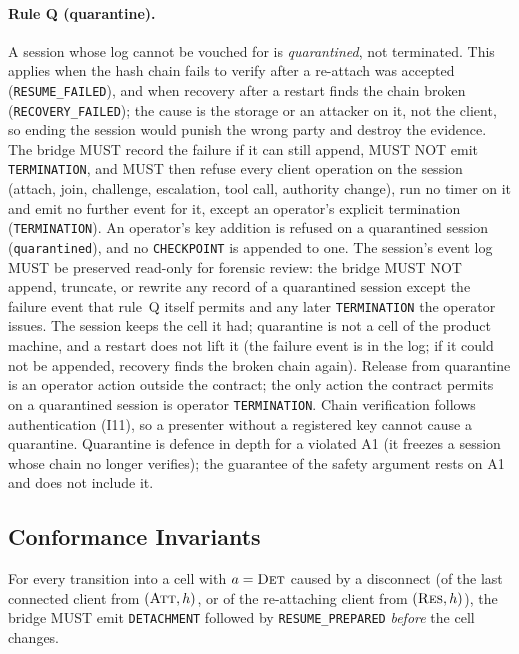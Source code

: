 \paragraph{Rule Q (quarantine).} A session whose log cannot be vouched
for is \emph{quarantined}, not terminated. This applies when the hash
chain fails to verify after a re-attach was accepted
(\texttt{RESUME\_FAILED}), and when recovery after a restart finds the
chain broken
(\texttt{RECOVERY\_FAILED}); the cause is the storage or an attacker on it,
not the client, so ending the session would punish the wrong party and
destroy the evidence. The bridge MUST record the failure if it can still
append, MUST NOT emit \texttt{TERMINATION}, and MUST then refuse every
client operation on the session (attach, join, challenge, escalation,
tool call, authority change), run no timer on it and emit no further event
for it, except an operator's explicit termination (\texttt{TERMINATION}).
An operator's key addition is refused on a quarantined session
(\texttt{quarantined}), and no \texttt{CHECKPOINT} is appended to one. The session's
event log MUST be preserved read-only for forensic review: the bridge
MUST NOT append, truncate, or rewrite any record of a quarantined
session except the failure event that rule~Q itself permits and any
later \texttt{TERMINATION} the operator issues. The session
keeps the cell it had; quarantine is not a cell of the product machine,
and a restart does not lift it (the failure event is in the log; if it
could not be appended, recovery finds the broken chain again). Release
from quarantine is an operator action outside the contract; the only
action the contract permits on a quarantined session is operator
\texttt{TERMINATION}. Chain
verification follows authentication (I11), so a presenter without a
registered key cannot cause a quarantine. Quarantine is defence in depth
for a violated A1 (it freezes a session whose chain no longer verifies);
the guarantee of the safety argument rests on A1 and does not include it.

\subsection{Conformance Invariants}

\begin{invariant}\label{inv:I1}
For every transition into a cell with $a=\textsc{Det}$ caused by a
disconnect (of the last connected client from $(\textsc{Att},h)$, or of
the re-attaching client from $(\textsc{Res},h)$), the bridge
MUST emit \texttt{DETACHMENT} followed by \texttt{RESUME\_PREPARED}
\emph{before} the cell changes.
\end{invariant}

